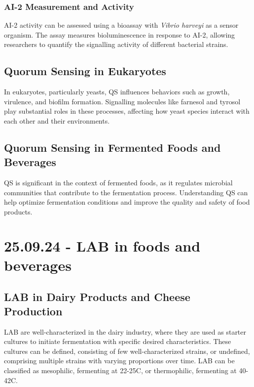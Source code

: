 \subsubsection{AI-2 Measurement and Activity} 
AI-2 activity can be assessed using a bioassay with \textit{Vibrio harveyi} as a sensor organism. The assay measures bioluminescence in response to AI-2, allowing researchers to quantify the signalling activity of different bacterial strains.

\subsection{Quorum Sensing in Eukaryotes} 
In eukaryotes, particularly yeasts, QS influences behaviors such as growth, virulence, and biofilm formation. Signalling molecules like farnesol and tyrosol play substantial roles in these processes, affecting how yeast species interact with each other and their environments.

\subsection{Quorum Sensing in Fermented Foods and Beverages} 
QS is significant in the context of fermented foods, as it regulates microbial communities that contribute to the fermentation process. Understanding QS can help optimize fermentation conditions and improve the quality and safety of food products.

\section{25.09.24 - LAB in foods and beverages}
\subsection{LAB in Dairy Products and Cheese Production} 
LAB are well-characterized in the dairy industry, where they are used as starter cultures to initiate fermentation with specific desired characteristics. These cultures can be defined, consisting of few well-characterized strains, or undefined, comprising multiple strains with varying proportions over time. LAB can be classified as mesophilic, fermenting at 22-25\textdegree C, or thermophilic, fermenting at 40-42\textdegree C.

